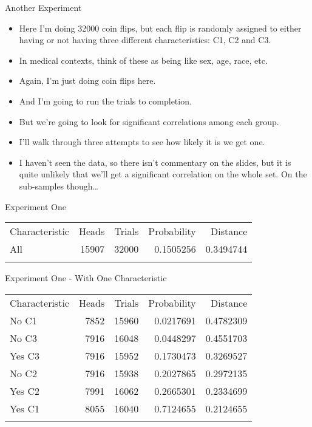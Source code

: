 \documentclass[
  ignorenonframetext,
]{beamer}
\providecommand{\tightlist}{%
  \setlength{\itemsep}{0pt}\setlength{\parskip}{0pt}}
\renewcommand{\,}{\text{, }}
\begin{document}
\begin{frame}{Another Experiment}
\protect\hypertarget{another-experiment}{}
\begin{itemize}
\tightlist
\item
  Here I'm doing 32000 coin flips, but each flip is randomly assigned to
  either having or not having three different characteristics: C1, C2
  and C3.
\item
  In medical contexts, think of these as being like sex, age, race, etc.
\item
  Again, I'm just doing coin flips here.
\item
  And I'm going to run the trials to completion.
\item
  But we're going to look for significant correlations among each group.
\item
  I'll walk through three attempts to see how likely it is we get one.
\item
  I haven't seen the data, so there isn't commentary on the slides, but
  it is quite unlikely that we'll get a significant correlation on the
  whole set. On the sub-samples though\ldots{}
\end{itemize}
\end{frame}

\begin{frame}{Experiment One}
\protect\hypertarget{experiment-one}{}
\begin{longtable}[]{@{}lrrrr@{}}
\toprule
Characteristic & Heads & Trials & Probability &
Distance \\ \addlinespace
\midrule
\endhead
All & 15907 & 32000 & 0.1505256 & 0.3494744 \\ \addlinespace
\bottomrule
\end{longtable}
\end{frame}

\begin{frame}{Experiment One - With One Characteristic}
\protect\hypertarget{experiment-one---with-one-characteristic}{}
\begin{longtable}[]{@{}lrrrr@{}}
\toprule
Characteristic & Heads & Trials & Probability &
Distance \\ \addlinespace
\midrule
\endhead
No C1 & 7852 & 15960 & 0.0217691 & 0.4782309 \\ \addlinespace
No C3 & 7916 & 16048 & 0.0448297 & 0.4551703 \\ \addlinespace
Yes C3 & 7916 & 15952 & 0.1730473 & 0.3269527 \\ \addlinespace
No C2 & 7916 & 15938 & 0.2027865 & 0.2972135 \\ \addlinespace
Yes C2 & 7991 & 16062 & 0.2665301 & 0.2334699 \\ \addlinespace
Yes C1 & 8055 & 16040 & 0.7124655 & 0.2124655 \\ \addlinespace
\bottomrule
\end{longtable}
\end{frame}
\end{document}
